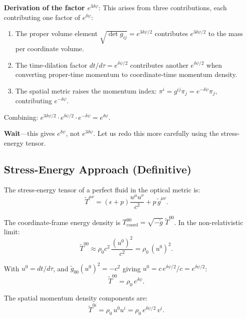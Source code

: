 \documentclass[12pt,twocolumn]{article}
\newcommand{\dpsi}{\delta\psi}
\begin{document}
\textbf{Derivation of the factor $e^{3\dpsi}$}: This arises from three
contributions, each contributing one factor of $e^{\dpsi}$:
\begin{enumerate}[noitemsep]
\item The proper volume element $\sqrt{\det g_{ij}} = e^{3\dpsi/2}$
  contributes $e^{3\dpsi/2}$ to the mass per coordinate volume.
\item The time-dilation factor $dt/d\tau = e^{\dpsi/2}$ contributes another
  $e^{\dpsi/2}$ when converting proper-time momentum to coordinate-time
  momentum density.
\item The spatial metric raises the momentum index: $\pi^i = g^{ij}\pi_j =
  e^{-\dpsi}\pi_j$, contributing $e^{-\dpsi}$.
\end{enumerate}

Combining: $e^{3\dpsi/2} \cdot e^{\dpsi/2} \cdot e^{-\dpsi} = e^{\dpsi}$.

\textbf{Wait}---this gives $e^{\dpsi}$, not $e^{3\dpsi}$. Let us redo this
more carefully using the stress-energy tensor.

\subsection{Stress-Energy Approach (Definitive)}
\label{sec:stress_energy}

The stress-energy tensor of a perfect fluid in the optical metric is:
\begin{equation}
\tilde{T}^{\mu\nu} = (\epsilon + p)\frac{u^\mu u^\nu}{c^2} + p\,\tilde{g}^{\mu\nu}.
\end{equation}

The coordinate-frame energy density is $T^{00}_\mathrm{coord} =
\sqrt{-\tilde{g}}\;\tilde{T}^{00}$. In the non-relativistic limit:
\begin{equation}
\tilde{T}^{00} \approx \rho_0 c^2\,\frac{(u^0)^2}{c^2}
= \rho_0\,(u^0)^2.
\end{equation}

With $u^0 = dt/d\tau$, and $\tilde{g}_{00}(u^0)^2 = -c^2$ giving
$u^0 = c\,e^{\dpsi/2}/c = e^{\dpsi/2}$:
\begin{equation}
\tilde{T}^{00} = \rho_0\,e^{\dpsi}.
\end{equation}

The spatial momentum density components are:
\begin{equation}
\tilde{T}^{0i} = \rho_0\,u^0 u^i = \rho_0\,e^{\dpsi/2}\,v^i.
\end{equation}
\end{document}
